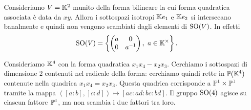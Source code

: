 \begin{example}[Caso $m=1$] Consideriamo $V=\mathbb{K}^2$ munito della forma bilineare la cui forma quadratica associata è data da $xy$. Allora i sottospazi isotropi $\mathbb{K} e_1$ e $\mathbb{K} e_2$ si intersecano banalmente e quindi non vengono scambiati dagli elementi di $\operatorname{SO}(V)$.  In effetti 
    \[\operatorname{SO}(V)=\left\{\begin{pmatrix}
    a & 0 \\
    0 & a^{-1}
\end{pmatrix}, \ a\in \mathbb{K}^\times\right\}.\]
\end{example}
\begin{example}
    [Caso $m=2$] Consideriamo $\mathbb{K}^4$ con la forma quadratica $x_1x_4-x_2x_3$. Cerchiamo i sottospazi di dimensione $2$ contenuti nel radicale della forma: cerchiamo quindi rette in $\mathbb{P}(\mathbb{K}^4)$ contenute nella quadrica $x_1x_4=x_2x_3$. Questa quadrica corrisponde a $\mathbb{P}^1 \times \mathbb{P}^1$ tramite la mappa $([a:b],[c:d])\mapsto [ac:ad:bc:bd]$. Il gruppo $\operatorname{SO}(4)$ agisce su ciascun fattore $\mathbb{P}^1$, ma non scambia i due fattori tra loro. %
\end{example}